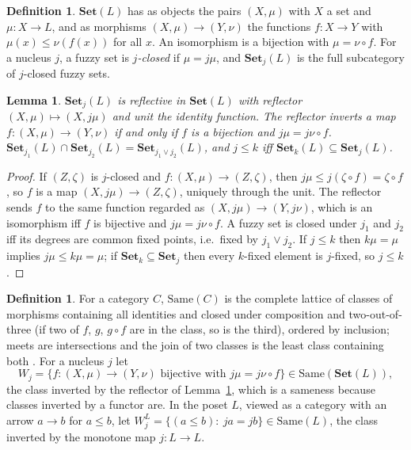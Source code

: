 \documentclass[11pt]{amsart}
\newtheorem{lem}[thm]{Lemma}
\theoremstyle{definition}
\newtheorem{defi}[thm]{Definition}
\newcommand{\Same}{\mathrm{Same}}
\newcommand{\FSet}{\mathbf{Set}}
\begin{document}
\begin{defi}
$\FSet(L)$ has as objects the pairs $(X,\mu)$ with $X$ a set and
$\mu\colon X\to L$, and as morphisms $(X,\mu)\to(Y,\nu)$ the functions
$f\colon X\to Y$ with $\mu(x)\le\nu(f(x))$ for all $x$. An isomorphism is a
bijection with $\mu=\nu\circ f$. For a nucleus $j$, a fuzzy set is
\emph{$j$-closed} if $\mu=j\mu$, and $\FSet_j(L)$ is the full subcategory
of $j$-closed fuzzy sets.
\end{defi}

\begin{lem}\label{lem:refl}
$\FSet_j(L)$ is reflective in $\FSet(L)$ with reflector $(X,\mu)\mapsto
(X,j\mu)$ and unit the identity function. The reflector inverts a map
$f\colon(X,\mu)\to(Y,\nu)$ if and only if $f$ is a bijection and
$j\mu=j\nu\circ f$. $\FSet_{j_1}(L)\cap\FSet_{j_2}(L)=\FSet_{j_1\vee j_2}(L)$,
and $j\le k$ iff $\FSet_k(L)\subseteq\FSet_j(L)$.
\end{lem}
\begin{proof}
If $(Z,\zeta)$ is $j$-closed and $f\colon(X,\mu)\to(Z,\zeta)$, then
$j\mu\le j(\zeta\circ f)=\zeta\circ f$, so $f$ is a map $(X,j\mu)\to(Z,\zeta)$,
uniquely through the unit. The reflector sends $f$ to the same function
regarded as $(X,j\mu)\to(Y,j\nu)$, which is an isomorphism iff $f$ is
bijective and $j\mu=j\nu\circ f$. A fuzzy set is closed under $j_1$ and
$j_2$ iff its degrees are common fixed points, i.e.\ fixed by
$j_1\vee j_2$. If $j\le k$ then $k\mu=\mu$ implies $j\mu\le k\mu=\mu$; if
$\FSet_k\subseteq\FSet_j$ then every $k$-fixed element is $j$-fixed, so
$j\le k$.
\end{proof}

\begin{defi}
For a category $C$, $\Same(C)$ is the complete lattice of classes of
morphisms containing all identities and closed under composition and
two-out-of-three (if two of $f$, $g$, $g\circ f$ are in the class, so is the
third), ordered by inclusion; meets are intersections and the join of two
classes is the least class containing both \cite{Same}. For a nucleus $j$
let
\[
W_j=\{f\colon(X,\mu)\to(Y,\nu)\text{ bijective with }j\mu=j\nu\circ f\}\in\Same(\FSet(L)),
\]
the class inverted by the reflector of Lemma~\ref{lem:refl}, which is a
sameness because classes inverted by a functor are. In the poset $L$,
viewed as a category with an arrow $a\to b$ for $a\le b$, let
$W_j^L=\{(a\le b):\ ja=jb\}\in\Same(L)$, the class inverted by the monotone
map $j\colon L\to L$.
\end{defi}
\end{document}
